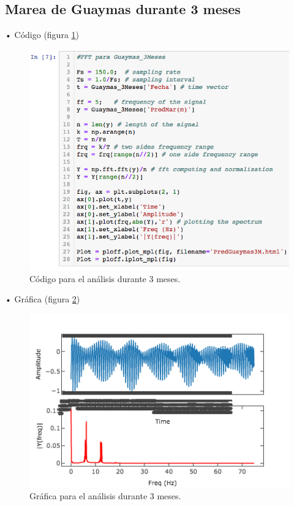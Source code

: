 \documentclass[12pt]{article}
\begin{document}
\subsection{Marea de Guaymas durante 3 meses}

\noindent • Código (figura \ref{fig:cod-3m}) \\

\begin{figure}[h!]
	\center
	\includegraphics[scale=.6]{./Images/cod-3m}
	\caption{\label{fig:cod-3m} Código para el análisis durante 3 meses.}
\end{figure}

\noindent • Gráfica (figura \ref{fig:graf-3m}) \\

\begin{figure}[h!]
	\center
	\includegraphics[scale=.6]{./Images/graf-3m}
	\caption{\label{fig:graf-3m} Gráfica para el análisis durante 3 meses.}
\end{figure}
\end{document}
